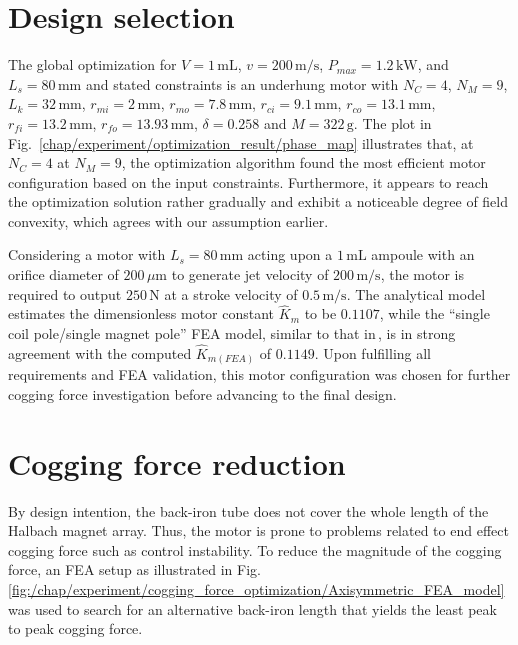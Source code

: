 \section{Design selection}                          \label{Chapter:experiment/design selection}


    The global optimization for $V = 1\,\mathrm{mL}$, $v = 200\,\mathrm{m/s}$, $P_{max} = 1.2\,\mathrm{kW}$, and $L_s = 80\,\mathrm{mm}$ and stated constraints is an underhung motor with $N_C = 4$, $N_M = 9$, $L_k = 32\,\mathrm{mm}$, $r_{mi} = 2\,\mathrm{mm}$, $r_{mo} = 7.8\,\mathrm{mm}$, $r_{ci} = 9.1\,\mathrm{mm}$, $r_{co} = 13.1\,\mathrm{mm}$, $r_{fi} = 13.2\,\mathrm{mm}$, $r_{fo} = 13.93\,\mathrm{mm}$, $\delta = 0.258$ and $M = 322\,\mathrm{g}$. The plot in Fig.~\ref{chap/experiment/optimization_result/phase_map} illustrates that, at $N_C = 4$ at $N_M = 9$, the optimization algorithm found the most efficient motor configuration based on the input constraints. Furthermore, it appears to reach the optimization solution rather gradually and exhibit a noticeable degree of field convexity, which agrees with our assumption earlier.
    
    Considering a motor with $L_s = 80\,\mathrm{mm}$ acting upon a $1\,\mathrm{mL}$ ampoule with an orifice diameter of $200\,\mu \mathrm{m}$ to generate jet velocity of $200\,\mathrm{m/s}$, the motor is required to output $250\,\mathrm{N}$ at a stroke velocity of $0.5\,\mathrm{m/s}$. The analytical model estimates the dimensionless motor constant $\hat{K}_m$ to be $0.1107$, while the “single coil pole/single magnet pole” \acs{FEA} model, similar to that in\,\cite{Ruddy2011}, is in strong agreement with the computed $\hat{K}_{m(FEA)}$ of $0.1149$. Upon fulfilling all requirements and \acs{FEA} validation, this motor configuration was chosen for further cogging force investigation before advancing to the final design.


\section{Cogging force reduction}                   \label{Chapter:experiment/cogging reduction}


    By design intention, the back-iron tube does not cover the whole length of the Halbach magnet array. Thus, the motor is prone to problems related to end effect cogging force such as control instability. To reduce the magnitude of the cogging force, an \acs{FEA} setup as illustrated in Fig.\,\ref{fig:/chap/experiment/cogging_force_optimization/Axisymmetric_FEA_model} was used to search for an alternative back-iron length that yields the least peak to peak cogging force. 
    
